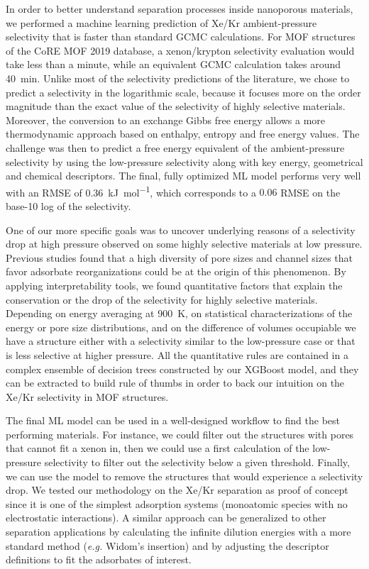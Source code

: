 \documentclass[main]{subfiles}
\begin{document}
In order to better understand separation processes inside nanoporous materials, we performed a machine learning prediction of Xe/Kr ambient-pressure selectivity that is faster than standard GCMC calculations. For MOF structures of the CoRE MOF 2019 database, a xenon/krypton selectivity evaluation would take less than a minute, while an equivalent GCMC calculation takes around \SI{40}{\minute}. Unlike most of the selectivity predictions of the literature, we chose to predict a selectivity in the logarithmic scale, because it focuses more on the order magnitude than the exact value of the selectivity of highly selective materials. Moreover, the conversion to an exchange Gibbs free energy allows a more thermodynamic approach based on enthalpy, entropy and free energy values. The challenge was then to predict a free energy equivalent of the ambient-pressure selectivity by using the low-pressure selectivity along with key energy, geometrical and chemical descriptors. The final, fully optimized ML model performs very well with an RMSE of \SI{0.36}{\kilo\joule\per\mole}, which corresponds to a $0.06$ RMSE on the base-10 log of the selectivity.

One of our more specific goals was to uncover underlying reasons of a selectivity drop at high pressure observed on some highly selective materials at low pressure. Previous studies found that a high diversity of pore sizes and channel sizes that favor adsorbate reorganizations could be at the origin of this phenomenon.\autocite{Ren_2021} By applying interpretability tools, we found quantitative factors that explain the conservation or the drop of the selectivity for highly selective materials. Depending on energy averaging at \SI{900}{\kelvin}, on statistical characterizations of the energy or pore size distributions, and on the difference of volumes occupiable we have a structure either with a selectivity similar to the low-pressure case or that is less selective at higher pressure. All the quantitative rules are contained in a complex ensemble of decision trees constructed by our XGBoost model, and they can be extracted to build rule of thumbs in order to back our intuition on the Xe/Kr selectivity in MOF structures.

The final ML model can be used in a well-designed workflow to find the best performing materials. For instance, we could filter out the structures with pores that cannot fit a xenon in, then we could use a first calculation of the low-pressure selectivity to filter out the selectivity below a given threshold. Finally, we can use the model to remove the structures that would experience a selectivity drop. We tested our methodology on the Xe/Kr separation as proof of concept since it is one of the simplest adsorption systems (monoatomic species with no electrostatic interactions). A similar approach can be generalized to other separation applications by calculating the infinite dilution energies with a more standard method (\emph{e.g.} Widom's insertion) and by adjusting the descriptor definitions to fit the adsorbates of interest.
\end{document}
